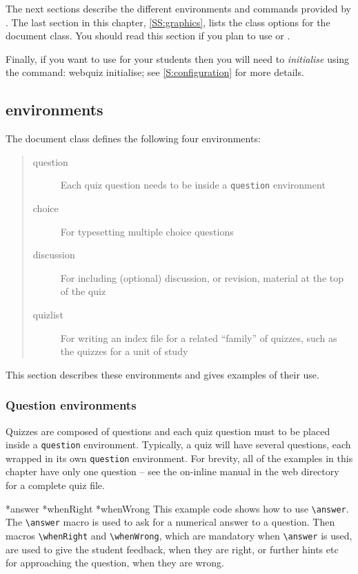 \documentclass[svgnames]{article}
\makeatletter
\newcommand\macroIndex[1]{%
  \lowercase{\def\temp{#1}}%
  \expandafter\index\expandafter{\temp@\textbackslash#1}%
}
\newcommand\gobbleone[1]{}%
\newcommand\SeeIndex[2]{\index{#1!zzzz@\protect\gobbleone|See{#2}}}
\newcommand\ddash{\texttt{\textemdash\textemdash}}
\newcommand\webquizopt[1]{\textsf{webquiz \ddash#1}}
\makeatother
\begin{document}
  The next sections describe the different environments and commands
  provided by \WebQuiz. The last section in this chapter,
  \autoref{SS:graphics}, lists the class options for the \WebQuiz
  document class. You should read this section if you plan to use
   or .

  Finally, if you want to use \WebQuiz for your students then you will
  need to \textit{initialise} \WebQuiz using the command:
  \webquizopt{initialise}; see \autoref{S:configuration} for more
  details.

\subsection{\WebQuiz environments}

The \WebQuiz document class defines the following four environments:
\begin{quote}
  \begin{description}
    \item[question] Each quiz question needs to be inside a
    \Verb|question| environment
    \item[choice] For typesetting multiple choice questions
    \item[discussion] For including (optional) discussion, or revision, material at
    the top of the quiz
    \item[quizlist] For writing an index file for a related ``family'' of quizzes,
    such as the quizzes for a unit of study
  \end{description}
\end{quote}
This section describes these environments and gives examples
of their use.

\subsubsection{Question environments}

Quizzes are composed of questions and each quiz question must to be
placed inside a \Verb|question| environment. Typically, a quiz will have
several questions, each wrapped in its own \Verb|question| environment.
For brevity, all of the examples in this chapter have only one question
-- see the on-inline manual in the \WebQuiz web directory for a complete quiz file.

  
  \macroIndex{answer}*{answer}
  *{whenRight}
  *{whenWrong}
  \SeeIndex{numeric answer}{\textbackslash answer}
  This example code shows how to use \Verb|\answer|. The \Verb|\answer|
  macro is used to ask for a numerical answer to a question. Then macros
  \Verb|\whenRight| and \Verb|\whenWrong|, which are mandatory when
  \Verb|\answer| is used, are used to give the student feedback, when
  they are right, or further hints etc for approaching the question,
  when they are wrong.
\end{document}
